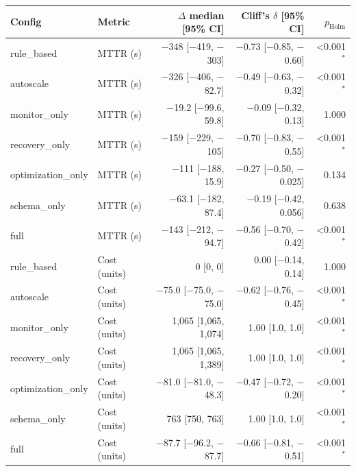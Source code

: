 \begin{tabular}{llrrr}
\toprule
Config & Metric & $\Delta$ median [95\% CI] & Cliff's $\delta$ [95\% CI] & $p_{\mathrm{Holm}}$ \\
\midrule
rule\_based & MTTR (s) & \ensuremath{-}348 [\ensuremath{-}419, \ensuremath{-}303] & \ensuremath{-}0.73 [\ensuremath{-}0.85, \ensuremath{-}0.60] & <0.001$^{*}$ \\
autoscale & MTTR (s) & \ensuremath{-}326 [\ensuremath{-}406, \ensuremath{-}82.7] & \ensuremath{-}0.49 [\ensuremath{-}0.63, \ensuremath{-}0.32] & <0.001$^{*}$ \\
monitor\_only & MTTR (s) & \ensuremath{-}19.2 [\ensuremath{-}99.6, 59.8] & \ensuremath{-}0.09 [\ensuremath{-}0.32, 0.13] & 1.000 \\
recovery\_only & MTTR (s) & \ensuremath{-}159 [\ensuremath{-}229, \ensuremath{-}105] & \ensuremath{-}0.70 [\ensuremath{-}0.83, \ensuremath{-}0.55] & <0.001$^{*}$ \\
optimization\_only & MTTR (s) & \ensuremath{-}111 [\ensuremath{-}188, 15.9] & \ensuremath{-}0.27 [\ensuremath{-}0.50, \ensuremath{-}0.025] & 0.134 \\
schema\_only & MTTR (s) & \ensuremath{-}63.1 [\ensuremath{-}182, 87.4] & \ensuremath{-}0.19 [\ensuremath{-}0.42, 0.056] & 0.638 \\
full & MTTR (s) & \ensuremath{-}143 [\ensuremath{-}212, \ensuremath{-}94.7] & \ensuremath{-}0.56 [\ensuremath{-}0.70, \ensuremath{-}0.42] & <0.001$^{*}$ \\
rule\_based & Cost (units) & 0 [0, 0] & 0.00 [\ensuremath{-}0.14, 0.14] & 1.000 \\
autoscale & Cost (units) & \ensuremath{-}75.0 [\ensuremath{-}75.0, \ensuremath{-}75.0] & \ensuremath{-}0.62 [\ensuremath{-}0.76, \ensuremath{-}0.45] & <0.001$^{*}$ \\
monitor\_only & Cost (units) & 1{,}065 [1{,}065, 1{,}074] & 1.00 [1.0, 1.0] & <0.001$^{*}$ \\
recovery\_only & Cost (units) & 1{,}065 [1{,}065, 1{,}389] & 1.00 [1.0, 1.0] & <0.001$^{*}$ \\
optimization\_only & Cost (units) & \ensuremath{-}81.0 [\ensuremath{-}81.0, \ensuremath{-}48.3] & \ensuremath{-}0.47 [\ensuremath{-}0.72, \ensuremath{-}0.20] & <0.001$^{*}$ \\
schema\_only & Cost (units) & 763 [750, 763] & 1.00 [1.0, 1.0] & <0.001$^{*}$ \\
full & Cost (units) & \ensuremath{-}87.7 [\ensuremath{-}96.2, \ensuremath{-}87.7] & \ensuremath{-}0.66 [\ensuremath{-}0.81, \ensuremath{-}0.51] & <0.001$^{*}$ \\

\end{tabular}
